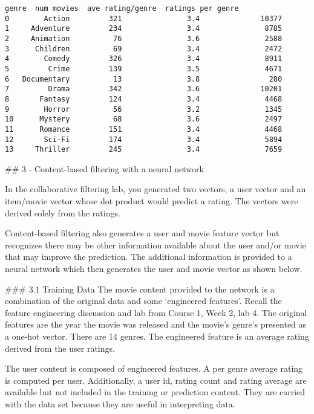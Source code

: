 \documentclass[11pt]{article}
\makeatletter
\newcommand{\boxspacing}{\kern\kvtcb@left@rule\kern\kvtcb@boxsep}
\newcommand{\prompt}[4]{
        \ttfamily\llap{{\color{#2}[#3]:\hspace{3pt}#4}}\vspace{-\baselineskip}
    }
\makeatother
\begin{document}
            \begin{tcolorbox}[breakable, size=fbox, boxrule=.5pt, pad at break*=1mm, opacityfill=0]
\prompt{Out}{outcolor}{3}{\boxspacing}
\begin{Verbatim}[commandchars=\\\{\}]
          genre  num movies  ave rating/genre  ratings per genre
0        Action         321               3.4              10377
1     Adventure         234               3.4               8785
2     Animation          76               3.6               2588
3      Children          69               3.4               2472
4        Comedy         326               3.4               8911
5         Crime         139               3.5               4671
6   Documentary          13               3.8                280
7         Drama         342               3.6              10201
8       Fantasy         124               3.4               4468
9        Horror          56               3.2               1345
10      Mystery          68               3.6               2497
11      Romance         151               3.4               4468
12       Sci-Fi         174               3.4               5894
13     Thriller         245               3.4               7659
\end{Verbatim}
\end{tcolorbox}
        
    \#\# 3 - Content-based filtering with a neural network

In the collaborative filtering lab, you generated two vectors, a user
vector and an item/movie vector whose dot product would predict a
rating. The vectors were derived solely from the ratings.

Content-based filtering also generates a user and movie feature vector
but recognizes there may be other information available about the user
and/or movie that may improve the prediction. The additional information
is provided to a neural network which then generates the user and movie
vector as shown below.

\#\#\# 3.1 Training Data The movie content provided to the network is a
combination of the original data and some `engineered features'. Recall
the feature engineering discussion and lab from Course 1, Week 2, lab 4.
The original features are the year the movie was released and the
movie's genre's presented as a one-hot vector. There are 14 genres. The
engineered feature is an average rating derived from the user ratings.

The user content is composed of engineered features. A per genre average
rating is computed per user. Additionally, a user id, rating count and
rating average are available but not included in the training or
prediction content. They are carried with the data set because they are
useful in interpreting data.
\end{document}
